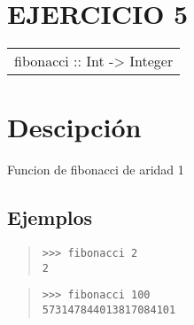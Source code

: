 \section{EJERCICIO 5}
\begin{haddockdesc}
\item[\begin{tabular}{@{}l}
fibonacci :: Int -> Integer
\end{tabular}]
{\haddockbegindoc
\section*{Descipción}
Funcion de fibonacci de aridad 1\par
\subsection*{Ejemplos}
\begin{quote}
{\haddockverb\begin{verbatim}
>>> fibonacci 2
2

\end{verbatim}}
\end{quote}
\begin{quote}
{\haddockverb\begin{verbatim}
>>> fibonacci 100
573147844013817084101

\end{verbatim}}
\end{quote}}
\end{haddockdesc}
